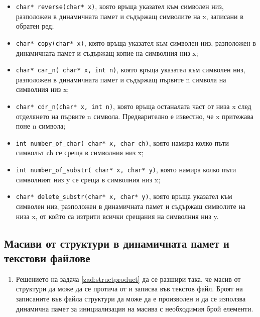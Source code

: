 {\begin{enumerate}
\begin{itemize}

\item \texttt{char* reverse(char* x)}, която връща указател към символен низ, разположен в динамичната памет и съдържащ символите на x, записани в обратен ред;
\item  \texttt{char* copy(char* x)}, която връща указател към символен низ, разположен в динамичната памет и съдържащ копие на символния низ x;
\item  \texttt{char* car\_n( char* x, int n)}, която връща указател към символен низ, разположен в динамичната памет и съдържащ първите n символа на символния низ x;
\item \texttt{char* cdr\_n(char* x, int n)}, която връща останалата част от низа x след отделянето на първите n символа. Предварително е известно, че x притежава поне n символа;
\item \texttt{int number\_of\_char( char* x, char ch)}, която намира колко пъти символът ch се среща в символния низ x;
\item \texttt{int number\_of\_substr( char* x, char* y)}, която намира колко пъти символният низ y се среща в символния низ x;
\item \texttt{char* delete\_substr(char* x, char* y)}, която връща указател към символен низ, разположен в динамичната памет и съдържащ символите на низа x, от който са изтрити всички срещания на символния низ y.

\end{itemize}

\end{enumerate}


\subsection {Масиви от структури в динамичната памет и текстови файлове}

\begin{enumerate}[resume]

\item Решението на задача \ref{zad:structproduct} да се разшири така, че масив от структури да може да се протича от и записва във текстов файл. Броят на записаните във файла структури да може да е произволен и да се използва динамична памет за инициализация на масива с необходимия брой елементи.


\end{enumerate}}
